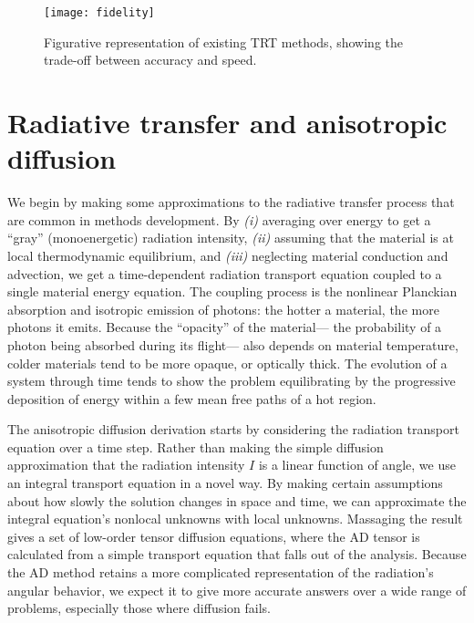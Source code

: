 \begin{figure}[htb]
  \centering
  \texttt{[image: fidelity]}
  \caption{Figurative representation of existing TRT methods, showing the
  trade-off between accuracy and speed.}
  \label{fig:fidelity}
\end{figure}

\section{Radiative transfer and anisotropic diffusion}
We begin by making some approximations to the radiative transfer
process that are common in methods development. By
\textsl{(i)} averaging over energy to get a ``gray'' (monoenergetic) radiation
intensity,
\textsl{(ii)} assuming that the material is at local thermodynamic equilibrium,
and
\textsl{(iii)} neglecting material conduction and advection,
we get a time-dependent radiation transport equation coupled to a single
material energy equation. The coupling process is the nonlinear Planckian
absorption and isotropic emission of photons: the hotter a material, the more
photons it emits.  Because the ``opacity'' of the material---%
the probability of a photon being absorbed during its flight---%
also depends on material temperature, colder materials tend to be more opaque,
or optically thick. The evolution of a system through time tends to show the
problem equilibrating by the progressive deposition of energy within a few mean
free paths of a hot region.

The anisotropic diffusion derivation starts by considering the radiation
transport equation over a time step. Rather than
making the simple diffusion approximation that the radiation intensity $I$ is a
linear function of angle, we use an integral transport equation in a novel way.
By making certain assumptions about how slowly the solution changes in space
and time, we can approximate the integral equation's nonlocal unknowns
with local unknowns. Massaging the result gives a set of low-order tensor
diffusion equations, where the AD tensor is calculated from a simple transport
equation that falls out of the analysis. Because the AD method retains a more
complicated representation of the radiation's angular behavior, we expect it
to give more accurate answers over a wide range of problems, especially those
where diffusion fails.


